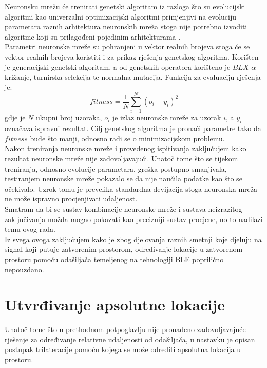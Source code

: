 Neuronsku mrežu će trenirati genetski algoritam iz razloga što su evolucijski algoritmi kao univerzalni optimizacijski algoritmi primjenjivi na evoluciju parametara raznih arhitektura neuronskih mreža stoga nije potrebno izvoditi algoritme koji su prilagođeni pojedinim arhitekturama \citep{nenr}.
\\
Parametri neuronske mreže su pohranjeni u vektor realnih brojeva stoga će se vektor realnih brojeva koristiti i za prikaz rješenja genetskog algoritma. 
Korišten je generacijski genetski algoritam, a od genetskih operatora korišteno je $BLX\text{-}\alpha$ križanje, turnirska selekcija te normalna mutacija. 
Funkcija za evaluaciju rješenja je:
\begin{equation}
    fitness = \frac{1}{N}\sum_{i=1}^{N}{(o_i - y_i)^2}
\end{equation}
gdje je $N$ ukupni broj uzoraka, $o_i$ je izlaz neuronske mreže za uzorak $i$, a $y_i$ označava ispravni rezultat. 
Cilj genetskog algoritma je pronaći parametre tako da $fitness$ bude što manji, odnosno radi se o minimizacijskom problemu.
\\

Nakon treniranja neuronske mreže i provedenog ispitivanja zaključujem kako rezultat neuronske mreže nije zadovoljavajući. 
Unatoč tome što se tijekom treniranja, odnosno evolucije parametara, greška postupno smanjivala, testiranjem neuronske mreže pokazalo se da nije naučila podatke kao što se očekivalo. 
Uzrok tomu je prevelika standardna devijacija stoga neuronska mreža ne može ispravno procjenjivati udaljenost.
\\
Smatram da bi se sustav kombinacije neuronske mreže i sustava neizrazitog zaključivanja možda mogao pokazati kao precizniji sustav procjene, no to nadilazi temu ovog rada.
\\
Iz svega ovoga zaključujem kako je zbog djelovanja raznih smetnji koje djeluju na signal koji putuje zatvorenim prostorom, određivanje lokacije u zatvorenom prostoru pomoću odašiljača temeljenog na tehnologiji BLE poprilično nepouzdano.

\section{Utvrđivanje apsolutne lokacije}

Unatoč tome što u prethodnom potpoglavlju nije pronađeno zadovoljavajuće rješenje za određivanje relativne udaljenosti od odašiljača, u nastavku je opisan postupak trilateracije pomoću kojega se može odrediti apsolutna lokacija u prostoru.
\\

